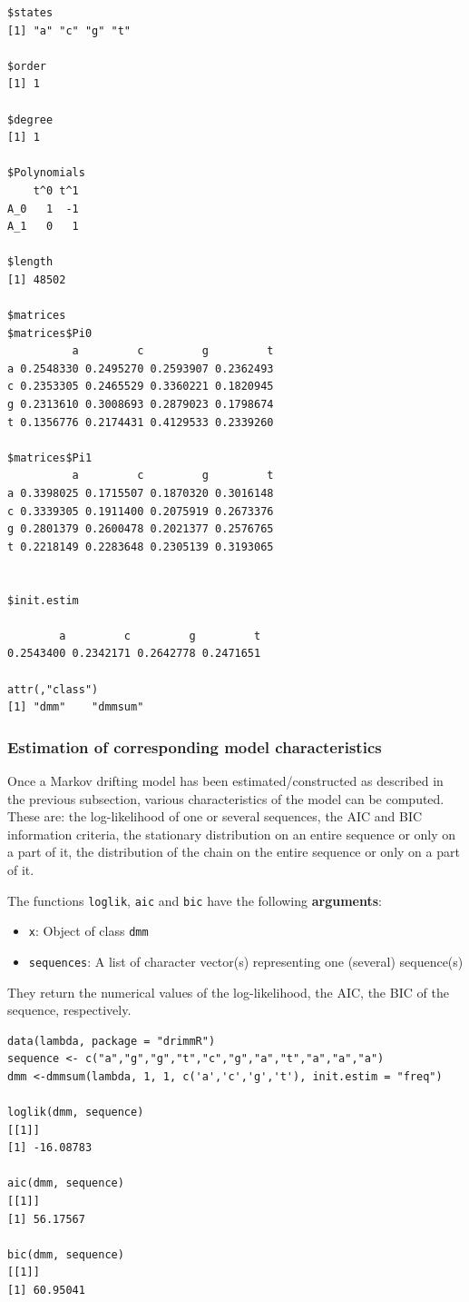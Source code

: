 \documentclass[article,nojss]{jss}\usepackage[]{graphicx}\usepackage[]{color}
\begin{document}
\begin{lstlisting}
$states
[1] "a" "c" "g" "t"

$order
[1] 1

$degree
[1] 1

$Polynomials
    t^0 t^1
A_0   1  -1
A_1   0   1

$length
[1] 48502

$matrices
$matrices$Pi0
          a         c         g         t
a 0.2548330 0.2495270 0.2593907 0.2362493
c 0.2353305 0.2465529 0.3360221 0.1820945
g 0.2313610 0.3008693 0.2879023 0.1798674
t 0.1356776 0.2174431 0.4129533 0.2339260

$matrices$Pi1
          a         c         g         t
a 0.3398025 0.1715507 0.1870320 0.3016148
c 0.3339305 0.1911400 0.2075919 0.2673376
g 0.2801379 0.2600478 0.2021377 0.2576765
t 0.2218149 0.2283648 0.2305139 0.3193065


$init.estim

        a         c         g         t
0.2543400 0.2342171 0.2642778 0.2471651

attr(,"class")
[1] "dmm"    "dmmsum"
\end{lstlisting}

\clearpage

\subsubsection{Estimation of corresponding model characteristics} \label{subsection_pack_charact}

Once a Markov drifting model has been estimated/constructed as described in the previous subsection, various characteristics of the model can be computed. These are: the log-likelihood of one or several sequences, the AIC and BIC information criteria, the stationary distribution on an entire sequence or only on a part of it, the distribution of the chain on the entire sequence or only on a part of it.

The functions {\tt loglik}, {\tt aic} and {\tt bic}  have the following {\bf arguments}:
%
\begin{itemize}
\item {\tt x}: Object of class {\tt dmm}
\item {\tt sequences}:  A list of character vector(s) representing one (several) sequence(s)
\end{itemize}
%
They return the numerical values of the log-likelihood, the AIC, the BIC of the sequence, respectively.

\begin{lstlisting}
data(lambda, package = "drimmR")
sequence <- c("a","g","g","t","c","g","a","t","a","a","a")
dmm <-dmmsum(lambda, 1, 1, c('a','c','g','t'), init.estim = "freq")

loglik(dmm, sequence)
[[1]]
[1] -16.08783

aic(dmm, sequence)
[[1]]
[1] 56.17567

bic(dmm, sequence)
[[1]]
[1] 60.95041
\end{lstlisting}
\end{document}

